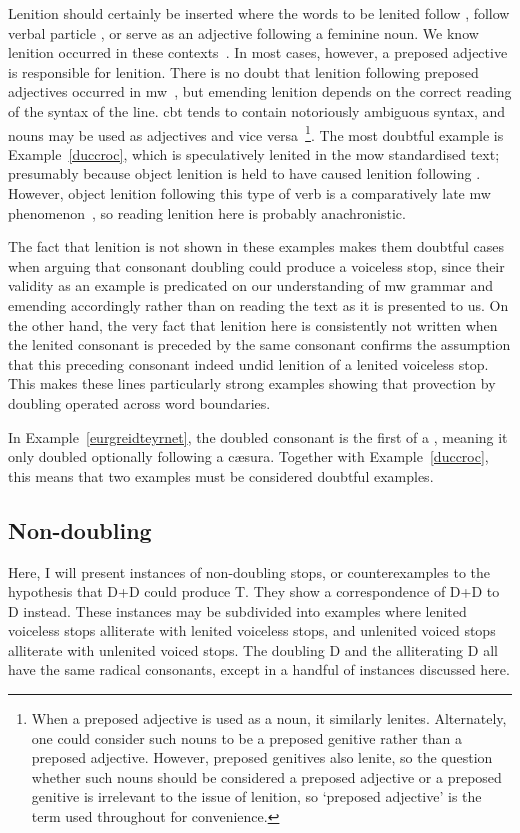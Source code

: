 Lenition should certainly be inserted where the words to be lenited follow , follow verbal particle , or serve as an adjective following a feminine noun. We know lenition occurred in these contexts~\autocite[§§~20, 22, 23]{evans_grammar_1964}. 
In most cases, however, a preposed adjective is responsible for lenition. There is no doubt that lenition following preposed adjectives occurred in \gls{mw}~\autocite[§~20]{evans_grammar_1964}, but emending lenition depends on the correct reading of the syntax of the line. \Gls{cbt} tends to contain notoriously ambiguous syntax, and nouns may be used as adjectives and vice versa~\autocite{daniel_cyfuniadau_2003}\footnote{When a preposed adjective is used as a noun, it similarly lenites. Alternately, one could consider such nouns to be a preposed genitive rather than a preposed adjective. However, preposed genitives also lenite, so the question whether such nouns should be considered a preposed adjective or a preposed genitive is irrelevant to the issue of lenition, so `preposed adjective' is the term used throughout for convenience.}. 
The most doubtful example is Example~\ref{duccroc}, which is speculatively lenited in the \gls{mow} standardised text; presumably because object lenition is held to have caused lenition following . However, object lenition following this type of verb is a comparatively late \gls{mw} phenomenon~\autocite[55-57]{van_development14}, so reading lenition here is probably anachronistic. 

The fact that lenition is not shown in these examples makes them doubtful cases when arguing that consonant doubling could produce a voiceless stop, since their validity as an example is predicated on our understanding of \gls{mw} grammar and emending accordingly rather than on reading the text as it is presented to us. On the other hand, the very fact that lenition here is consistently not written when the lenited consonant is preceded by the same consonant confirms the assumption that this preceding consonant indeed undid  lenition of a lenited voiceless stop. This makes these lines particularly strong examples showing that provection by doubling operated across word boundaries.

In Example~\ref{eurgreidteyrnet}, the doubled consonant is the first of a , meaning it only doubled optionally following a cæsura. Together with Example~\ref{duccroc}, this means that two examples must be considered doubtful examples.

\subsection{Non-doubling}
Here, I will present instances of non-doubling stops, or counterexamples to the hypothesis that \gls{D}+\gls{D} could produce \gls{T}. They show a correspondence of \gls{D}+\gls{D} to \gls{D} instead. These instances may be subdivided into examples where lenited voiceless stops alliterate with lenited voiceless stops, and unlenited voiced stops alliterate with unlenited voiced stops. The doubling \gls{D} and the alliterating \gls{D} all have the same radical consonants, except in a handful of instances discussed here.

